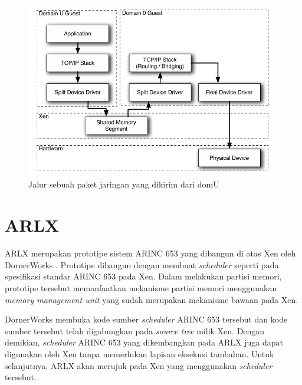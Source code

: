 \begin{figure}[!ht]
    \includegraphics[scale=0.5]{./resources/xen-split-driver.png}
    \caption[Jalur sebuah paket jaringan yang dikirim dari domU]{Jalur sebuah paket jaringan yang dikirim dari domU \citep{Chisnall2014}}
    \label{figure:xen_split_driver}
\end{figure}

\section{ARLX}

ARLX merupakan prototipe sistem ARINC 653 yang dibangun di atas Xen oleh DornerWorks
\citep{VanderLeest2010}. Prototipe dibangun dengan membuat \textit{scheduler} seperti pada
spesifikasi standar ARINC 653 pada Xen. Dalam melakukan partisi memori, prototipe tersebut
memanfaatkan mekanisme partisi memori menggunakan \textit{memory management unit} yang sudah
merupakan mekanisme bawaan pada Xen.

DornerWorks membuka kode sumber \textit{scheduler} ARINC 653 tersebut dan kode sumber tersebut
telah digabungkan pada \textit{source tree} milik Xen. Dengan demikian, \textit{scheduler} ARINC
653 yang dikembangkan pada ARLX juga dapat digunakan oleh Xen tanpa memerlukan lapisan eksekusi
tambahan. Untuk selanjutnya, ARLX akan merujuk pada Xen yang menggunakan \textit{scheduler}
tersebut.

